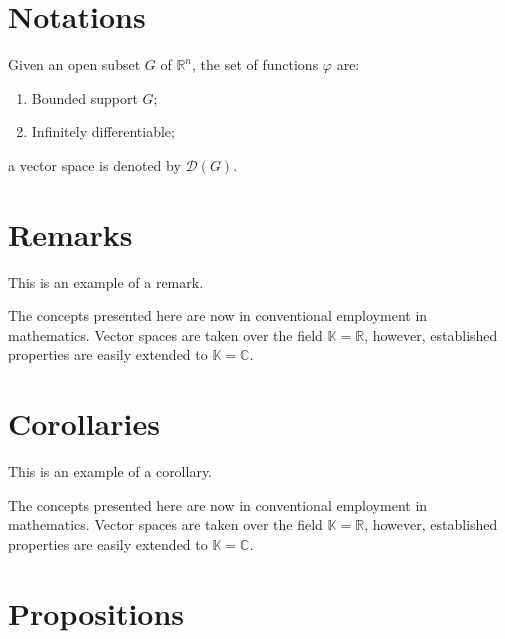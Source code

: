\documentclass[11pt,fleqn]{book} %
\begin{document}

\section{Notations}

\begin{notation}
Given an open subset $G$ of $\mathbb{R}^n$, the set of functions $\varphi$ are:
\begin{enumerate}
\item Bounded support $G$;
\item Infinitely differentiable;
\end{enumerate}
a vector space is denoted by $\mathcal{D}(G)$. 
\end{notation}


\section{Remarks}

This is an example of a remark.

\begin{remark}
The concepts presented here are now in conventional employment in mathematics. Vector spaces are taken over the field $\mathbb{K}=\mathbb{R}$, however, established properties are easily extended to $\mathbb{K}=\mathbb{C}$.
\end{remark}


\section{Corollaries}

This is an example of a corollary.

\begin{corollary}
The concepts presented here are now in conventional employment in mathematics. Vector spaces are taken over the field $\mathbb{K}=\mathbb{R}$, however, established properties are easily extended to $\mathbb{K}=\mathbb{C}$.
\end{corollary}


\section{Propositions}
\end{document}
